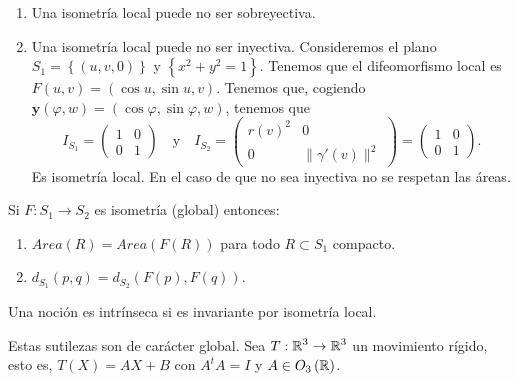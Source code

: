 \begin{observation}
\begin{enumerate}
\item Una isometría local puede no ser sobreyectiva. %
\item Una isometría local puede no ser inyectiva. Consideremos el plano $\displaystyle S_{1}= \left\{ \left(u,v,0\right)\right\}  $ y $\displaystyle \left\{ x^{2}+y^{2} = 1\right\}  $. Tenemos que el difeomorfismo local es $\displaystyle F\left(u,v\right)=\left(\cos u, \sin u, v\right) $. Tenemos que, cogiendo $\displaystyle \textbf{y} \left(\varphi,w\right)=\left(\cos \varphi, \sin \varphi, w\right) $, tenemos que 
	\[I_{S_{1}}=\begin{pmatrix} 1 & 0 \\ 0 & 1 \end{pmatrix}\quad \text{y} \quad I_{S_{2}}=\begin{pmatrix} r\left(v\right)^{2} & 0 \\ 0 & \|\gamma'\left(v\right)\|^{2} \end{pmatrix}=\begin{pmatrix} 1 & 0 \\ 0 & 1 \end{pmatrix} .\]
	Es isometría local. En el caso de que no sea inyectiva no se respetan las áreas. 
\end{enumerate}
\end{observation}
\begin{prop}
Si $\displaystyle F : S_{1}\to S_{2} $ es isometría (global) entonces:
\begin{enumerate}
\item $\displaystyle Area\left(R\right)=Area\left(F\left(R\right)\right) $ para todo $\displaystyle R \subset S_{1} $ compacto. 
\item $\displaystyle d _{S_{1}}\left(p,q\right)=d _{S_{2}}\left(F\left(p\right), F\left(q\right)\right) $.
\end{enumerate}
\end{prop}
\begin{definition}
Una noción es intrínseca si es invariante por isometría local. 
\end{definition}
Estas sutilezas son de carácter global.
Sea $\displaystyle T : \mathbb{R}^{3}\to \mathbb{R}^{3} $ un movimiento rígido, esto es, $\displaystyle T\left(X\right)=AX + B $ con $\displaystyle A^{t}A = I $ y $\displaystyle A \in O_{3}\left(\mathbb{R}\right) $. 
